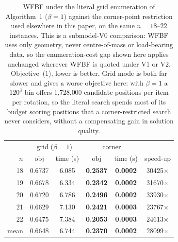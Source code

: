 
\providecommand{\up}{\rule{0pt}{2.6ex}}
\providecommand{\down}{\rule[-1.2ex]{0pt}{0pt}}

\begin{table}[htbp]
\centering
\caption{WFBF under the literal grid enumeration of Algorithm~1
($\beta = 1$) against the corner-point restriction used elsewhere in
this paper, on the same $n = 18$--$22$ instances. This is a submodel-V0
comparison: WFBF uses only geometry, never centre-of-mass or
load-bearing data, so the enumeration-cost gap shown here applies
unchanged wherever WFBF is quoted under V1 or V2. Objective~(1), lower
is better. Grid mode is both far slower and gives a worse objective
here: with $\beta=1$ a $120^3$ bin offers 1{,}728{,}000 candidate
positions per item per rotation, so the literal search spends most of
its budget scoring positions that a corner-restricted search never
considers, without a compensating gain in solution quality.}
\label{tab:wfbf-grid-vs-corner}
\begin{tabular}{@{}r@{\quad}cc@{\quad}cc@{\quad}c@{}}
\hline\up
 & \multicolumn{2}{c}{grid ($\beta=1$)} & \multicolumn{2}{c}{corner} & \\
$n$ & obj & time (s) & obj & time (s) & speed-up \\ \hline\up
18 & 0.6737 & 6.085 & \textbf{0.2537} & \textbf{0.0002} & 30425$\times$ \\
19 & 0.6678 & 6.334 & \textbf{0.2342} & \textbf{0.0002} & 31670$\times$ \\
20 & 0.6720 & 6.786 & \textbf{0.2496} & \textbf{0.0002} & 33930$\times$ \\
21 & 0.6629 & 7.130 & \textbf{0.2421} & \textbf{0.0003} & 23767$\times$ \\
22 & 0.6475 & 7.384 & \textbf{0.2053} & \textbf{0.0003} & 24613$\times$ \\
\hline\up
mean & 0.6648 & 6.744 & \textbf{0.2370} & \textbf{0.0002} & 28099$\times$ \down\\ \hline
\end{tabular}
\end{table}
